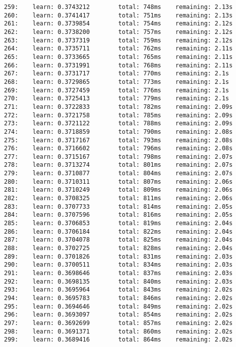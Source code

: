 \documentclass[11pt]{article}
\begin{document}
\begin{Verbatim}[commandchars=\\\{\}]
259:    learn: 0.3743212        total: 748ms    remaining: 2.13s
260:    learn: 0.3741417        total: 751ms    remaining: 2.13s
261:    learn: 0.3739854        total: 754ms    remaining: 2.12s
262:    learn: 0.3738200        total: 757ms    remaining: 2.12s
263:    learn: 0.3737319        total: 759ms    remaining: 2.12s
264:    learn: 0.3735711        total: 762ms    remaining: 2.11s
265:    learn: 0.3733665        total: 765ms    remaining: 2.11s
266:    learn: 0.3731991        total: 768ms    remaining: 2.11s
267:    learn: 0.3731717        total: 770ms    remaining: 2.1s
268:    learn: 0.3729865        total: 773ms    remaining: 2.1s
269:    learn: 0.3727459        total: 776ms    remaining: 2.1s
270:    learn: 0.3725413        total: 779ms    remaining: 2.1s
271:    learn: 0.3722833        total: 782ms    remaining: 2.09s
272:    learn: 0.3721758        total: 785ms    remaining: 2.09s
273:    learn: 0.3721122        total: 788ms    remaining: 2.09s
274:    learn: 0.3718859        total: 790ms    remaining: 2.08s
275:    learn: 0.3717167        total: 793ms    remaining: 2.08s
276:    learn: 0.3716602        total: 796ms    remaining: 2.08s
277:    learn: 0.3715167        total: 798ms    remaining: 2.07s
278:    learn: 0.3713274        total: 801ms    remaining: 2.07s
279:    learn: 0.3710877        total: 804ms    remaining: 2.07s
280:    learn: 0.3710311        total: 807ms    remaining: 2.06s
281:    learn: 0.3710249        total: 809ms    remaining: 2.06s
282:    learn: 0.3708325        total: 811ms    remaining: 2.06s
283:    learn: 0.3707733        total: 814ms    remaining: 2.05s
284:    learn: 0.3707596        total: 816ms    remaining: 2.05s
285:    learn: 0.3706853        total: 819ms    remaining: 2.04s
286:    learn: 0.3706184        total: 822ms    remaining: 2.04s
287:    learn: 0.3704078        total: 825ms    remaining: 2.04s
288:    learn: 0.3702725        total: 828ms    remaining: 2.04s
289:    learn: 0.3701826        total: 831ms    remaining: 2.03s
290:    learn: 0.3700511        total: 834ms    remaining: 2.03s
291:    learn: 0.3698646        total: 837ms    remaining: 2.03s
292:    learn: 0.3698135        total: 840ms    remaining: 2.03s
293:    learn: 0.3695964        total: 843ms    remaining: 2.02s
294:    learn: 0.3695783        total: 846ms    remaining: 2.02s
295:    learn: 0.3694646        total: 849ms    remaining: 2.02s
296:    learn: 0.3693097        total: 854ms    remaining: 2.02s
297:    learn: 0.3692699        total: 857ms    remaining: 2.02s
298:    learn: 0.3691371        total: 860ms    remaining: 2.02s
299:    learn: 0.3689416        total: 864ms    remaining: 2.02s

\end{Verbatim}
\end{document}
